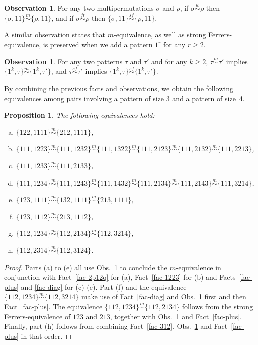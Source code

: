 \documentclass[11pt]{amsart}
\theoremstyle{plain}
\newtheorem{proposition}[theorem]{Proposition}
\theoremstyle{definition}
\newtheorem{observation}[theorem]{Observation}
\newcommand{\msim}{\stackrel{m}{\sim}}
\newcommand{\wsim}{\stackrel{w}{\sim}}
\newcommand{\sfsim}{\stackrel{sf}{\sim}}
\newcommand{\ftsim}{\stackrel{ft}{\sim}}
\begin{document}
\begin{observation}\label{obs-11}
For any two multipermutations $\sigma$ and $\rho$, if $\sigma\wsim\rho$ then
$\{\sigma,11\}\msim\{\rho,11\}$, and if $\sigma\ftsim\rho$ then $\{\sigma,11\}\sfsim\{\rho,11\}$.
\end{observation}

A similar observation states that $m$-equivalence, as well as strong Ferrers-equivalence, is
preserved when we add a pattern $1^r$ for any $r\ge 2$.

\begin{observation}\label{obs-1r} For any two patterns $\tau$ and $\tau'$ and for any $k\ge 2$,
$\tau\msim\tau'$
implies  $\{1^k,\tau\}\msim\{1^k,\tau'\}$, and $\tau\sfsim\tau'$
implies  $\{1^k,\tau\}\sfsim\{1^k,\tau'\}$.
\end{observation}

By combining the previous facts and observations, we obtain the following equivalences among pairs
involving a pattern of size 3 and a pattern of size~4.

\begin{proposition}\label{pro-ferrers} The following equivalences hold:
\begin{enumerate}[(a)]
\item $\{122,1111\}\msim\{212,1111\}$,
\item
$\{111,1223\}\msim\{111,1232\}\msim\{111,1322\}\msim\{111,2123\}\msim\{111,2132\}\msim\{111,2213\}$,
\item $\{111,1233\}\msim\{111,2133\}$,
\item
$\{111,1234\}\msim\{111,1243\}\msim\{111,1432\}\msim\{111,2134\}\msim\{111,2143\}\msim\{111,3214\}$,
\item
$\{123,1111\}\msim\{132,1111\}\msim\{213,1111\}$,
\item $\{123,1112\}\msim\{213,1112\}$,
\item $\{112,1234\}\msim\{112,2134\}\msim\{112,3214\}$,
\item $\{112,2314\}\msim\{112,3124\}$.
\end{enumerate}
\end{proposition}
\begin{proof}
Parts (a) to (e) all use Obs.~\ref{obs-1r} to conclude the $m$-equivalence in conjunction with Fact~\ref{fac-2p12q} for (a), Fact~\ref{fac-1223} for (b) and Facts~\ref{fac-plus} and \ref{fac-diag} for (c)-(e).  Part (f) and the equivalence $\{112,1234\}\msim\{112,3214\}$ make use of Fact~\ref{fac-diag} and Obs.~\ref{obs-1r} first and then Fact~\ref{fac-plus}.  The equivalence $\{112,1234\}\msim\{112,2134\}$ follows from the strong Ferrers-equivalence of $123$ and $213$, together with Obs.~\ref{obs-1r} and Fact~\ref{fac-plus}.  Finally, part (h) follows from combining Fact~\ref{fac-312}, Obs.~\ref{obs-11} and Fact~\ref{fac-plus} in that order.
\end{proof}
\end{document}
